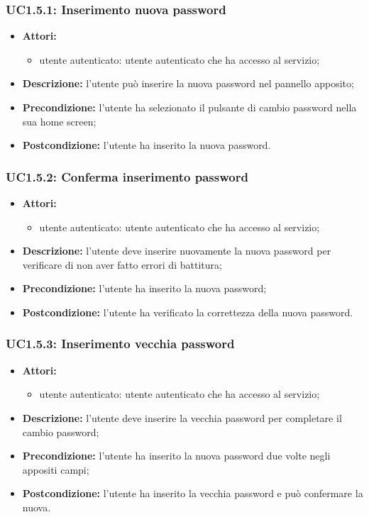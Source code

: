 \subsubsection{UC1.5.1: Inserimento nuova password}

\begin{itemize}
	\item \textbf{Attori:}
	\begin{itemize}
		\item utente autenticato: utente autenticato che ha accesso al servizio;
	\end{itemize}
	\item \textbf{Descrizione:} l'utente può inserire la nuova password nel pannello apposito;
	\item \textbf{Precondizione:} l'utente ha selezionato il pulsante di cambio password nella sua home screen;
	\item \textbf{Postcondizione:} l'utente ha inserito la nuova password.
\end{itemize}

\subsubsection{UC1.5.2: Conferma inserimento password }

\begin{itemize}
	\item \textbf{Attori:}
	\begin{itemize}
		\item utente autenticato: utente autenticato che ha accesso al servizio;
	\end{itemize}
	\item \textbf{Descrizione:} l'utente deve inserire nuovamente la nuova password per verificare di non aver fatto errori di battitura;
	\item \textbf{Precondizione:} l'utente ha inserito la nuova password;
	\item \textbf{Postcondizione:} l'utente ha verificato la correttezza della nuova password.
\end{itemize}

\subsubsection{UC1.5.3: Inserimento vecchia password}

\begin{itemize}
	\item \textbf{Attori:}
	\begin{itemize}
		\item utente autenticato: utente autenticato che ha accesso al servizio;
	\end{itemize}
	\item \textbf{Descrizione:} l'utente deve inserire la vecchia password per completare il cambio password;
	\item \textbf{Precondizione:} l'utente ha inserito la nuova password due volte negli appositi campi;
	\item \textbf{Postcondizione:} l'utente ha inserito la vecchia password e può confermare la nuova.
\end{itemize}

